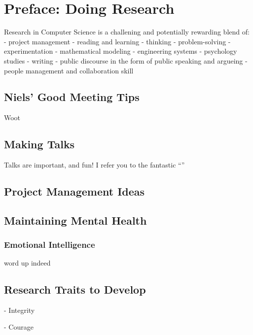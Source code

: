 \chapter{Preface: Doing Research}

Research in Computer Science is a challening and potentially rewarding blend of:
- project management
- reading and learning
- thinking
- problem-solving
- experimentation
- mathematical modeling
- engineering systems
- psychology studies
- writing
- public discourse in the form of public speaking and argueing
- people management and collaboration skill

\section{Niels' Good Meeting Tips}
Woot

\section{Making Talks}
Talks are important, and fun! I refer you to the fantastic ``''

\section{Project Management Ideas}

\section{Maintaining Mental Health}

\subsection{Emotional Intelligence}

word up
indeed

\section{Research Traits to Develop}

- Integrity

- Courage

